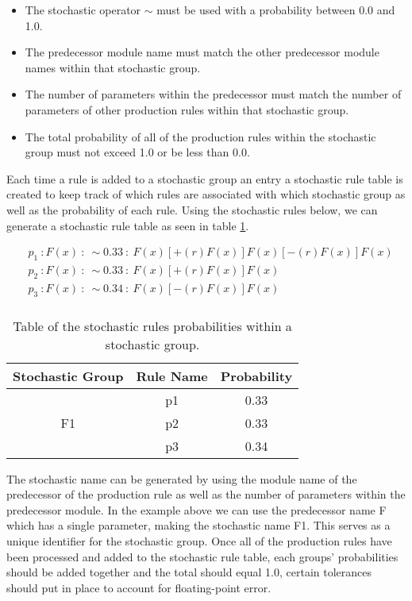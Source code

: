 \begin{itemize}
\item The stochastic operator $\sim$ must be used with a probability between 0.0 and 1.0.
\item The predecessor module name must match the other predecessor module names within that stochastic group.
\item The number of parameters within the predecessor must match the number of parameters of other production rules within that stochastic group.
\item The total probability of all of the production rules within the stochastic group must not exceed 1.0 or be less than 0.0.
\end{itemize}

Each time a rule is added to a stochastic group an entry a stochastic rule table is created to keep track of which rules are associated with which stochastic group as well as the probability of each rule. Using the stochastic rules below, we can generate a stochastic rule table as seen in table \ref{stochastic table}. 

\begin{equation} \label{stochastic implementation example}
\begin{aligned}
	&p_1~ :  F(x)~ :~ \sim 0.33 ~ :~ F(x)[+(r)F(x)]F(x)[-(r)F(x)]F(x)\\
	&p_2~ :  F(x)~ :~ \sim 0.33 ~ :~ F(x)[+(r)F(x)]F(x)\\
	&p_3~ :  F(x)~ :~ \sim 0.34 ~ :~ F(x)[-(r)F(x)]F(x)\\
\end{aligned}
\end{equation}

\begin{table}[h!] \center
\begin{tabular}{ | c | c | c | }
\hline
	Stochastic Group & Rule Name & Probability\\  
\hline
\hline
\multirow{3}{*}{F1} & p1 & 0.33 \\
& p2 & 0.33 \\
& p3 & 0.34 \\
\hline
\end{tabular}
\caption{Table of the stochastic rules probabilities within a stochastic group.}
\label{stochastic table}
\end{table}
\FloatBarrier

The stochastic name can be generated by using the module name of the predecessor of the production rule as well as the number of parameters within the predecessor module. In the example above we can use the predecessor name F which has a single parameter, making the stochastic name F1. This serves as a unique identifier for the stochastic group. Once all of the production rules have been processed and added to the stochastic rule table, each groups' probabilities should be added together and the total should equal 1.0, certain tolerances should put in place to account for floating-point error. 

